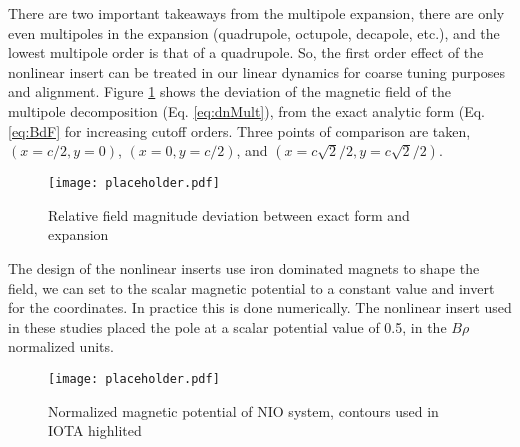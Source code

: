 There are two important takeaways from the multipole expansion, there are only even multipoles in the expansion (quadrupole, octupole, decapole, etc.), and the lowest multipole order is that of a quadrupole. So, the first order effect of the nonlinear insert can be treated in our linear dynamics for coarse tuning purposes and alignment. Figure \ref{fig:dnMultRatio} shows the deviation of the magnetic field of the multipole decomposition (Eq. \ref{eq:dnMult}), from the exact analytic form (Eq. \ref{eq:BdF} for increasing cutoff orders. Three points of comparison are taken, $(x=c/2,y=0)$, $(x=0,y=c/2)$, and $(x=c\sqrt{2}/2,y=c\sqrt{2}/2)$. 

\begin{figure}
	\centering
	\texttt{[image: placeholder.pdf]}
	\caption{Relative field magnitude deviation between exact form and expansion}
	\label{fig:dnMultRatio}
\end{figure}

The design of the nonlinear inserts use iron dominated magnets to shape the field, we can set to the scalar magnetic potential to a constant value and invert for the coordinates. In practice this is done numerically. The nonlinear insert used in these studies placed the pole at a scalar potential value of 0.5, in the $B\rho$ normalized units. 

\begin{figure}
	\centering
	\texttt{[image: placeholder.pdf]}
	\caption{Normalized magnetic potential of NIO system, contours used in IOTA highlited}
	\label{fig:dnMagPtCurve}
\end{figure}
